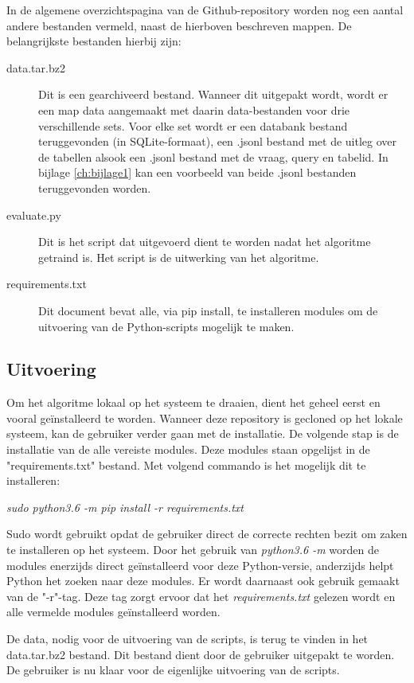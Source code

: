 In de algemene overzichtspagina van de Github-repository worden nog een aantal andere bestanden vermeld, naast de hierboven beschreven mappen. De belangrijkste bestanden hierbij zijn:
\begin{description}
	\item[data.tar.bz2] Dit is een gearchiveerd bestand. Wanneer dit uitgepakt wordt, wordt er een map data aangemaakt met daarin data-bestanden voor drie verschillende sets. Voor elke set wordt er een databank bestand teruggevonden (in SQLite-formaat), een .jsonl bestand met de uitleg over de tabellen alsook een .jsonl bestand met de vraag, query en tabelid. In bijlage \ref{ch:bijlage1} kan een voorbeeld van beide .jsonl bestanden teruggevonden worden.
	\item[evaluate.py] Dit is het script dat uitgevoerd dient te worden nadat het algoritme getraind is. Het script is de uitwerking van het algoritme.
	\item[requirements.txt] Dit document bevat alle, via pip install, te installeren modules om de uitvoering van de Python-scripts mogelijk te maken.
\end{description}

\subsection{Uitvoering}

Om het algoritme lokaal op het systeem te draaien, dient het geheel eerst en vooral geïnstalleerd te worden. Wanneer deze repository is gecloned op het lokale systeem, kan de gebruiker verder gaan met de installatie. De volgende stap is de installatie van de alle vereiste modules. Deze modules staan opgelijst in de "requirements.txt" bestand. Met volgend commando is het mogelijk dit te installeren:
\begin{center}
	\textit{sudo python3.6 -m pip install -r requirements.txt}
\end{center}
Sudo wordt gebruikt opdat de gebruiker direct de correcte rechten bezit om zaken te installeren op het systeem. Door het gebruik van \textit{python3.6 -m} worden de modules enerzijds direct geïnstalleerd voor deze Python-versie, anderzijds helpt Python het zoeken naar deze modules. Er wordt daarnaast ook gebruik gemaakt van de "-r"-tag. Deze tag zorgt ervoor dat het \textit{requirements.txt} gelezen wordt en alle vermelde modules geïnstalleerd worden.

De data, nodig voor de uitvoering van de scripts, is terug te vinden in het data.tar.bz2 bestand. Dit bestand dient door de gebruiker uitgepakt te worden. De gebruiker is nu klaar voor de eigenlijke uitvoering van de scripts.

